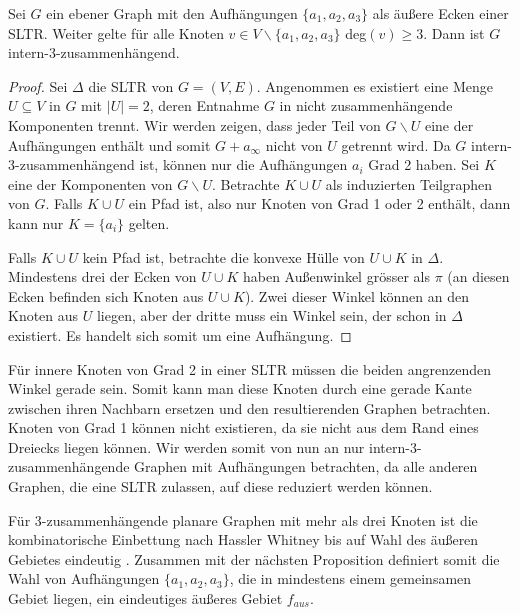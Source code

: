 \begin{proposition}\cite[Proposition 1.2]{af13}
Sei $G$ ein ebener Graph mit den Aufhängungen $\{a_1,a_2,a_3\}$ als äußere Ecken einer SLTR. Weiter gelte für alle Knoten $v\in V \backslash \{a_1,a_2,a_3\}$ deg$(v) \geq 3$. Dann ist $G$ intern-3-zusammenhängend.
\end{proposition}

\begin{proof}
Sei $\Delta$ die SLTR von $G=(V,E)$. Angenommen es existiert eine Menge $U \subseteq V$ in $G$ mit $|U| = 2$, deren Entnahme $G$ in nicht zusammenhängende Komponenten trennt. Wir werden zeigen, dass jeder Teil von $G\backslash U$ eine der Aufhängungen enthält und somit $G + a_\infty$ nicht von $U$ getrennt wird. Da $G$ intern-3-zusammenhängend ist, können nur die Aufhängungen $a_i$ Grad 2 haben. Sei $K$ eine der Komponenten von $G\backslash U$. Betrachte $K\cup U$ als induzierten Teilgraphen von $G$. Falls $K\cup U$ ein Pfad ist, also nur Knoten von Grad 1 oder 2 enthält, dann kann nur $K=\{a_i\}$ gelten.

Falls $K\cup U$ kein Pfad ist, betrachte die konvexe Hülle von $U \cup K$ in $\Delta$. Mindestens drei der Ecken von $U \cup K$ haben Außenwinkel grösser als $\pi$ (an diesen Ecken befinden sich Knoten aus $U \cup K$). Zwei dieser Winkel können an den Knoten aus $U$ liegen, aber der dritte muss ein Winkel sein, der schon in $\Delta$ existiert. Es handelt sich somit um eine Aufhängung.
\end{proof}

\begin{remark}
Für innere Knoten von Grad 2 in einer SLTR müssen die beiden angrenzenden Winkel gerade sein. Somit kann man diese Knoten durch eine gerade Kante zwischen ihren Nachbarn ersetzen und den resultierenden Graphen betrachten. Knoten von Grad 1 können nicht existieren, da sie nicht aus dem Rand eines Dreiecks liegen können. Wir werden somit von nun an nur intern-3-zusammenhängende Graphen mit Aufhängungen betrachten, da alle anderen Graphen, die eine SLTR zulassen, auf diese reduziert werden können.
\end{remark}

Für 3-zusammenhängende planare Graphen mit mehr als drei Knoten ist die kombinatorische Einbettung nach Hassler Whitney bis auf Wahl des äußeren Gebietes eindeutig \cite{whitney32}. Zusammen mit der nächsten Proposition definiert somit die Wahl von Aufhängungen $\{a_1,a_2,a_3\}$, die in mindestens einem gemeinsamen Gebiet liegen, ein eindeutiges äußeres Gebiet $f_{aus}$.

